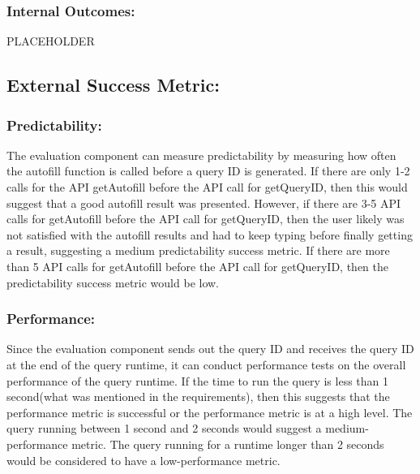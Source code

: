 \subsubsection*{Internal Outcomes:}
PLACEHOLDER




\bigskip\subsection*{External Success Metric:}

\medskip\subsubsection*{Predictability:}
The evaluation component can measure predictability by measuring how often the 
autofill function is called before a query ID is generated. If there are only 1-2 
calls for the API getAutofill before the API call for getQueryID, then this would 
suggest that a good autofill result was presented. However, if there are 3-5 API 
calls for getAutofill before the API call for getQueryID, then the user likely was 
not satisfied with the autofill results and had to keep typing before finally 
getting a result, suggesting a medium predictability success metric. If there are 
more than 5 API calls for getAutofill before the API call for getQueryID, then the 
predictability success metric would be low.

\smallskip\subsubsection*{Performance:}
Since the evaluation component sends out the query ID and receives the query ID at 
the end of the query runtime, it can conduct performance tests on the overall 
performance of the query runtime. If the time to run the query is less than 1 
second(what was mentioned in the requirements), then this suggests that the 
performance metric is successful or the performance metric is at a high level. The 
query running between 1 second and 2 seconds would suggest a medium-performance 
metric. The query running for a runtime longer than 2 seconds would be considered 
to have a low-performance metric. 


